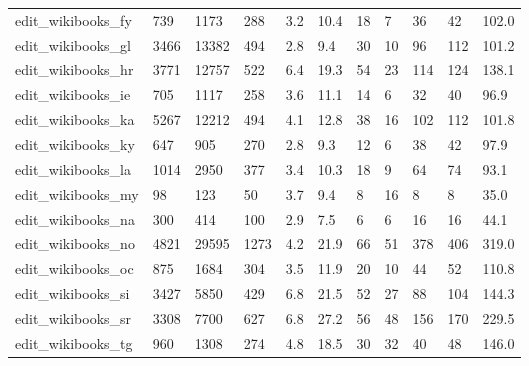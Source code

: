 \begin{longtable}{lllllllllll}
 edit\_wikibooks\_fy                                  & 739        & 1173      & 288   & 3.2    & 10.4   & 18    & 7      & 36     & 42     & 102.0   \\
 edit\_wikibooks\_gl                                  & 3466       & 13382     & 494   & 2.8    & 9.4    & 30    & 10     & 96     & 112    & 101.2   \\
 edit\_wikibooks\_hr                                  & 3771       & 12757     & 522   & 6.4    & 19.3   & 54    & 23     & 114    & 124    & 138.1   \\
 edit\_wikibooks\_ie                                  & 705        & 1117      & 258   & 3.6    & 11.1   & 14    & 6      & 32     & 40     & 96.9    \\
 edit\_wikibooks\_ka                                  & 5267       & 12212     & 494   & 4.1    & 12.8   & 38    & 16     & 102    & 112    & 101.8   \\
 edit\_wikibooks\_ky                                  & 647        & 905       & 270   & 2.8    & 9.3    & 12    & 6      & 38     & 42     & 97.9    \\
 edit\_wikibooks\_la                                  & 1014       & 2950      & 377   & 3.4    & 10.3   & 18    & 9      & 64     & 74     & 93.1    \\
 edit\_wikibooks\_my                                  & 98         & 123       & 50    & 3.7    & 9.4    & 8     & 16     & 8      & 8      & 35.0    \\
 edit\_wikibooks\_na                                  & 300        & 414       & 100   & 2.9    & 7.5    & 6     & 6      & 16     & 16     & 44.1    \\
 edit\_wikibooks\_no                                  & 4821       & 29595     & 1273  & 4.2    & 21.9   & 66    & 51     & 378    & 406    & 319.0   \\
 edit\_wikibooks\_oc                                  & 875        & 1684      & 304   & 3.5    & 11.9   & 20    & 10     & 44     & 52     & 110.8   \\
 edit\_wikibooks\_si                                  & 3427       & 5850      & 429   & 6.8    & 21.5   & 52    & 27     & 88     & 104    & 144.3   \\
 edit\_wikibooks\_sr                                  & 3308       & 7700      & 627   & 6.8    & 27.2   & 56    & 48     & 156    & 170    & 229.5   \\
 edit\_wikibooks\_tg                                  & 960        & 1308      & 274   & 4.8    & 18.5   & 30    & 32     & 40     & 48     & 146.0   \\

\end{longtable}
